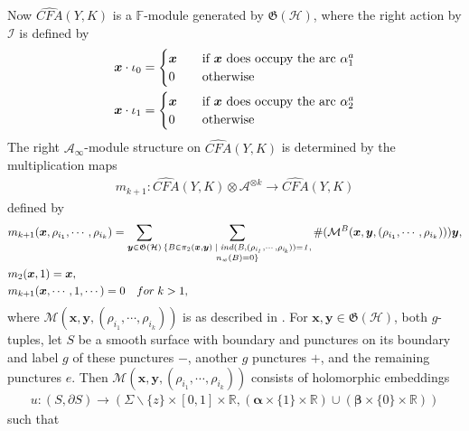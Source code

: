 \documentclass[11pt,reqno]{amsart}
\theoremstyle{definition}
\newtheorem *{remark}{Remark}
\newcommand{\cfahat}{\widehat{\mathit{CFA}}}
\begin{document}
Now $\cfahat(Y,K)$ is a $\mathbb{F}$-module generated by $\mathfrak{G}(\mathcal{H})$, where the right action by $\mathcal{I}$ is defined by  
\begin{align*}
    \bm{x} \cdot \iota_0 = 
    \begin{cases} 
    \bm{x} &\quad\text{if $\bm{x}$ \emph{does} occupy the arc $\alpha^a_1$} \\
    0 &\quad\text{otherwise}
\end{cases} \\
  \bm{x} \cdot\iota_1 = 
  \begin{cases}
  \bm{x} &\quad\text{if $\bm{x}$ \emph{does} occupy the arc $\alpha^a_2$} \\
  0 &\quad\text{otherwise}
  \end{cases}
\end{align*}
The right $\mathcal{A}_{\infty}$-module structure on $\cfahat(Y,K)$ is determined by the multiplication maps
\begin{align*}
    m_{k+1} : \cfahat(Y,K) \otimes \mathcal{A}^{\otimes k} \rightarrow \cfahat(Y,K)
\end{align*}
defined by
\begin{align*}
    & m_{k+1}(\bm{x}, \rho_{i_1}, \cdots,\rho_{i_k}) = \sum_{\bm{y} \in \mathfrak{G}(\mathcal{H})} \sum\limits_{\substack{\{B\in \pi_2(\bm{x},\bm{y})\;|\;\it{ind}(B,(\rho_{i_1},\cdots,\rho_{i_k}))= 1,\\n_w(B) = 0\}}} \#(\mathcal{M}^{B}(\bm{x},\bm{y},(\rho_{i_1},\cdots, \rho_{i_k}))) \bm{y}, \\
    & m_2(\bm{x},1) = \bm{x}, \\
   & m_{k+1}(\bm{x},\cdots,1,\cdots) = 0 \quad \rm{for}\; k > 1,
\end{align*}
where $\mathcal{M}(\bm{x},\bm{y},(\rho_{i_1},\cdots,\rho_{i_k}))$ is as described in \cite[Chapter 2] {lotnotes}. For $\bm{x}, \bm{y} \in \mathfrak{G}(\mathcal{H})$, both $g$-tuples,  let $S$ be a smooth surface with boundary and punctures on its boundary and label $g$ of these punctures $-$, another $g$ punctures $+$, and the remaining punctures $e$. Then $\mathcal{M}(\bm{x},\bm{y},(\rho_{i_1},\cdots,\rho_{i_k}))$ consists of holomorphic embeddings
\begin{gather*}
    u : (S, \partial S) \rightarrow (\Sigma \smallsetminus \{z\}  \times [0,1] \times \mathbb{R}, (\bm{\alpha}\times \{1\} \times \mathbb{R}) \cup (\bm{\beta} \times \{0\} \times \mathbb{R}))
\end{gather*}
such that 
\end{document}
